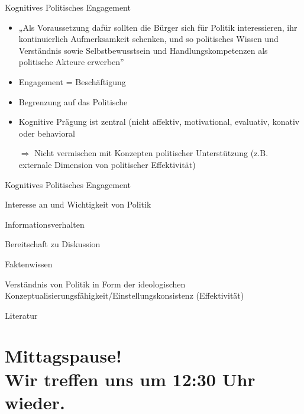 \documentclass[11pt]{beamer}
\begin{document}
\begin{frame}{Kognitives Politisches Engagement \parencite{Westle2020}}
	\begin{itemize}
		\item	„Als Voraussetzung dafür sollten die Bürger sich für Politik interessieren, ihr kontinuierlich Aufmerksamkeit schenken, und so politisches Wissen und Verständnis sowie Selbstbewusstsein und Handlungskompetenzen als politische Akteure erwerben” \parencite[273]{Westle2020}
	\end{itemize}
	
	\begin{itemize}
		\item Engagement = Beschäftigung \parencite[278]{Westle2020}
		\item Begrenzung auf das Politische \parencite[278]{Westle2020}
		\item Kognitive Prägung ist zentral (nicht affektiv, motivational, evaluativ, konativ oder behavioral \parencite[278]{Westle2020}
		\item[$\Rightarrow$] Nicht vermischen mit Konzepten politischer Unterstützung (z.B. externale Dimension von politischer Effektivität)
	\end{itemize}
\end{frame}

\begin{frame}{Kognitives Politisches Engagement \parencite{Westle2020}}
	\begin{nolist}
		\item Interesse an und Wichtigkeit von Politik
		\item Informationsverhalten
		\item Bereitschaft zu Diskussion
		\item Faktenwissen
		\item Verständnis von Politik in Form der ideologischen Konzeptualisierungsfähigkeit/Einstellungskonsistenz (Effektivität)
	\end{nolist}
\end{frame}

\renewcommand*{\bibfont}{\scriptsize}

\begin{frame}[allowframebreaks]{Literatur}
	\nocite{*}
	\printbibliography[heading = none]
\end{frame}

\section{Mittagspause! \\ Wir treffen uns um 12:30 Uhr wieder.}
\end{document}
